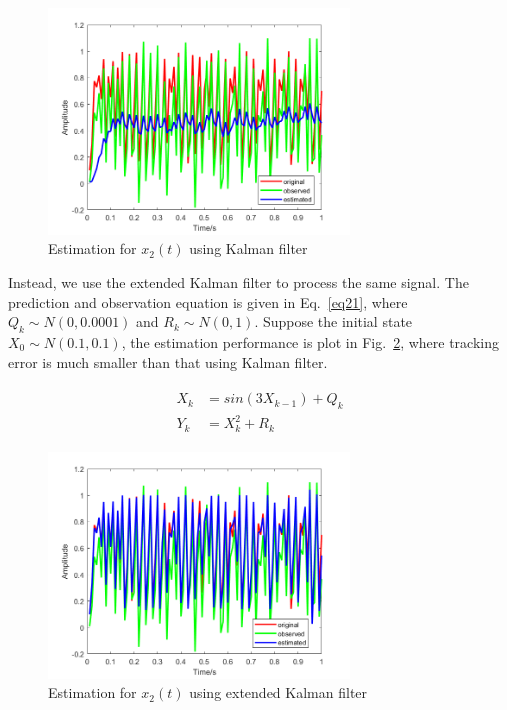 \documentclass[conference]{IEEEtran}
\begin{document}
	\begin{figure}[h]
		\centering
		\includegraphics[width=8cm]{fig3.png}
		\caption{Estimation for $x_{2}(t)$ using Kalman filter}
		\label{fig3}
	\end{figure}

	Instead, we use the extended Kalman filter to process the same signal. The prediction and observation equation is given in Eq.~\ref{eq21}, where $Q_{k}\sim N(0,0.0001)$ and $R_{k}\sim N(0,1)$. Suppose the initial state $X_{0}\sim N(0.1,0.1)$, the estimation performance is plot in Fig.~\ref{fig4}, where tracking error is much smaller than that using Kalman filter.
	
	\begin{equation}
	\begin{split}
	\begin{aligned}
	X_{k}&=sin(3X_{k-1})+Q_{k}\\
	Y_{k}&=X_{k}^{2}+R_{k}
	\label{eq21}
	\end{aligned}
	\end{split}
	\end{equation}
	
	\begin{figure}[h]
		\centering
		\includegraphics[width=8cm]{fig4.png}
		\caption{Estimation for $x_{2}(t)$ using extended Kalman filter}
		\label{fig4}
	\end{figure}
\end{document}
